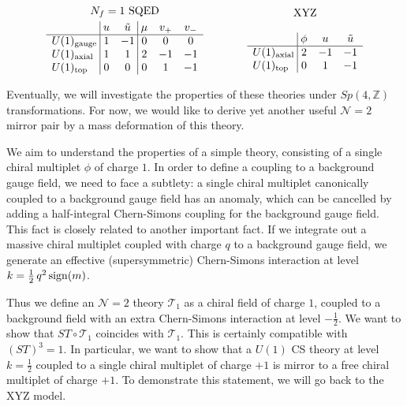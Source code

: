 \documentclass[hyper,letterpaper]{JHEP3}
\numberwithin{equation}{section}
\newcommand{\be}{\begin{equation}}
\newcommand{\ee}{\end{equation}}
\newcommand{\Z}{{\mathbb Z}}
\newcommand{\CN}{\mathcal{N}}
\newcommand{\CT}{\mathcal{T}}
\begin{document}
\begin{table}[htb]
\be
\begin{array}{l@{\;}|@{\;}cc@{\;}|@{\;}ccc}
\multicolumn{6}{c}{\text{$N_f=1$ SQED}} \\[.1cm]
& u & \tilde u & \mu & v_+ & v_- \\\hline
U(1)_{\rm gauge} & 1 & -1 & 0 & 0 & 0 \\
U(1)_{\rm axial} & 1 & 1 & 2 & -1 & -1 \\
U(1)_{\rm top} & 0 & 0 & 0 & 1 & -1
\end{array} \qquad\qquad
%
\begin{array}{l@{\;}|@{\;}ccc}
\multicolumn{4}{c}{\text{XYZ}} \\[.4cm]
& \phi & u & \tilde{u} \\\hline
U(1)_{\rm axial} & 2 & -1 & -1\\
U(1)_{\rm top} & 0 & 1 & -1
\end{array}
\notag \ee
\caption{Correspondence of symmetries in $N_f=1$ SQED and the XYZ model. The designations ``axial'' and ``topological'' in the XYZ model are only introduced for comparison to SQED.}
\label{tab:charges}
\end{table}



 Eventually, we will investigate the properties of these theories under $Sp(4,\Z)$ transformations.
For now, we would like to derive yet another useful $\CN=2$ mirror pair by a mass deformation of this theory.

We aim to understand the properties of a simple theory, consisting of a single chiral multiplet $\phi$ of charge $1$.
In order to define a coupling to a background gauge field,
we need to face a subtlety: a single chiral multiplet canonically coupled to a background gauge field has an anomaly,
which can be cancelled by adding a half-integral Chern-Simons coupling
for the background gauge field. This fact is closely related to another important fact.
If we integrate out a massive chiral multiplet coupled with charge $q$ to a background gauge field,
we generate an effective (supersymmetric) Chern-Simons interaction at level $k = \tfrac{1}{2}\,q^2\,{\rm sign} (m)$.

Thus we define an $\CN=2$ theory $\CT_1$ as a chiral field of charge $1$, coupled to a background field with an extra Chern-Simons interaction at level $-\tfrac{1}{2}$. We want to show that $ST \circ \CT_1$ coincides with $\CT_1$. This is certainly compatible with $(ST)^3 = 1$.
In particular, we want to show that a $U(1)$ CS theory at level $k=\tfrac{1}{2}$ coupled to a single chiral multiplet of charge $+1$
is mirror to a free chiral multiplet of charge $+1$.
To demonstrate this statement, we will go back to the XYZ model.
\end{document}
